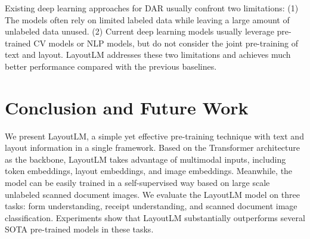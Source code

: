 \documentclass[sigconf]{acmart}
\begin{document}
Existing deep learning approaches for DAR usually confront two limitations: (1) The models often rely on limited labeled data while leaving a large amount of unlabeled data unused. (2) Current deep learning models usually leverage pre-trained CV models or NLP models, but do not consider the joint pre-training of text and layout. LayoutLM addresses these two limitations and achieves much better performance compared with the previous baselines. 


\section{Conclusion and Future Work}

We present LayoutLM, a simple yet effective pre-training technique with text and layout information in a single framework. Based on the Transformer architecture as the backbone, LayoutLM takes advantage of multimodal inputs, including token embeddings, layout embeddings, and image embeddings. Meanwhile, the model can be easily trained in a self-supervised way based on large scale unlabeled scanned document images. We evaluate the LayoutLM model on three tasks: form understanding, receipt understanding, and scanned document image classification. Experiments show that LayoutLM substantially outperforms several SOTA pre-trained models in these tasks.
\end{document}
